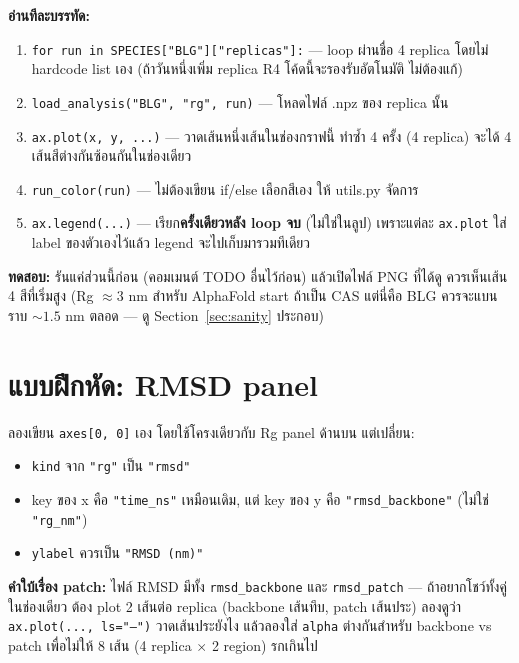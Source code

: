 \documentclass[11pt,a4paper]{article}
\begin{document}
\textbf{อ่านทีละบรรทัด:}
\begin{enumerate}
  \item \texttt{for run in SPECIES["BLG"]["replicas"]:} — loop ผ่านชื่อ 4 replica โดยไม่ hardcode
        list เอง (ถ้าวันหนึ่งเพิ่ม replica R4 โค้ดนี้จะรองรับอัตโนมัติ ไม่ต้องแก้)
  \item \texttt{load\_analysis("BLG", "rg", run)} — โหลดไฟล์ .npz ของ replica นั้น
  \item \texttt{ax.plot(x, y, ...)} — วาดเส้นหนึ่งเส้นในช่องกราฟนี้ ทำซ้ำ 4 ครั้ง (4 replica)
        จะได้ 4 เส้นสีต่างกันซ้อนกันในช่องเดียว
  \item \texttt{run\_color(run)} — ไม่ต้องเขียน if/else เลือกสีเอง ให้ utils.py จัดการ
  \item \texttt{ax.legend(...)} — เรียก\textbf{ครั้งเดียวหลัง loop จบ} (ไม่ใช่ในลูป) เพราะแต่ละ
        \texttt{ax.plot} ใส่ label ของตัวเองไว้แล้ว legend จะไปเก็บมารวมทีเดียว
\end{enumerate}

\textbf{ทดสอบ:} รันแค่ส่วนนี้ก่อน (คอมเมนต์ TODO อื่นไว้ก่อน) แล้วเปิดไฟล์ PNG ที่ได้ดู
ควรเห็นเส้น 4 สีที่เริ่มสูง (Rg $\approx 3$ nm สำหรับ AlphaFold start ถ้าเป็น CAS แต่นี่คือ BLG
ควรจะแบนราบ $\sim 1.5$ nm ตลอด — ดู Section~\ref{sec:sanity} ประกอบ)

\section{แบบฝึกหัด: RMSD panel}
ลองเขียน \texttt{axes[0, 0]} เอง โดยใช้โครงเดียวกับ Rg panel ด้านบน แต่เปลี่ยน:
\begin{itemize}
  \item \texttt{kind} จาก \texttt{"rg"} เป็น \texttt{"rmsd"}
  \item key ของ x คือ \texttt{"time\_ns"} เหมือนเดิม, แต่ key ของ y คือ \texttt{"rmsd\_backbone"}
        (ไม่ใช่ \texttt{"rg\_nm"})
  \item \texttt{ylabel} ควรเป็น \texttt{"RMSD (nm)"}
\end{itemize}

\textbf{คำใบ้เรื่อง patch:} ไฟล์ RMSD มีทั้ง \texttt{rmsd\_backbone} และ \texttt{rmsd\_patch}
— ถ้าอยากโชว์ทั้งคู่ในช่องเดียว ต้อง plot 2 เส้นต่อ replica (backbone เส้นทึบ, patch เส้นประ)
ลองดูว่า \texttt{ax.plot(..., ls="--")} วาดเส้นประยังไง แล้วลองใส่ \texttt{alpha} ต่างกันสำหรับ
backbone vs patch เพื่อไม่ให้ 8 เส้น (4 replica $\times$ 2 region) รกเกินไป
\end{document}
